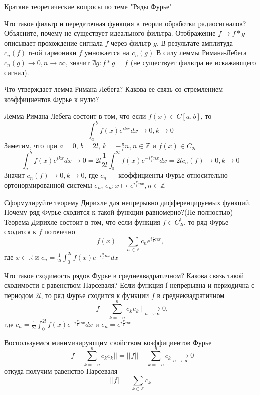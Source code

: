 \documentclass{article}
\begin{document}
\begin{section}{Краткие теоретические вопросы по теме "Ряды Фурье"}
\begin{subsection}{Что такое фильтр и передаточная функция в теории обработки радиосигналов? Объясните, почему не существует идеального фильтра.}
Отображение $f \rightarrow f*g$ описывает прохождение сигнала $f$ через фильтр $g$. 
В результате амплитуда $c_n(f)$ n-ой гармоники $f$ умножается на $c_n(g)$
В силу леммы Римана-Лебега $c_n(g)\rightarrow 0, n\rightarrow \infty$, значит $\nexists g: f*g=f$ (не существует фильтра не искажающего сигнал).
\end{subsection}


\begin{subsection}{Что утверждает лемма Римана-Лебега? Какова ее связь со стремлением коэффициентов Фурье к нулю?}

Лемма Римана-Лебега состоит в том, что если $f(x)\in C[a,b]$, то
\[\int_a^b f(x)e^{ikx}dx \rightarrow 0, k \rightarrow 0\]
Заметим, что при $a = 0$, $b = 2l$, $k=-\frac{\pi}{l}n, n \in \mathbb{Z}$ и $f(x)\in C_{2l}$ 
\[\int_a^b f(x)e^{ikx}dx \rightarrow 0 = 2l \frac{1}{2l}\int_0^{2l}f(x)e^{-i\frac{\pi}{l}nx}dx = 2lc_n(f) \rightarrow 0, k \rightarrow 0\]
Значит $c_n(f) \rightarrow 0, k \rightarrow 0$, 
где $c_n$ --- коэффициенты Фурье относительно ортонормированной системы ${e_n}$, $e_n: x \mapsto e^{i\frac{\pi}{l}nx}, n \in \mathbb{Z}$
\end{subsection}


\begin{subsection}{Сформулируйте теорему Дирихле для непрерывно дифференцируемых функций. Почему ряд Фурье сходится к такой функции равномерно?(Не полностью)}
Теорема Дирихле состоит в том, что если функция $f \in C_{2l}^1$, то ряд Фурье сходится к $f$ поточечно
\[f(x)=\sum_{n \in \mathbb{Z}} c_n e^{i\frac{\pi}{l}nx}, \]
где $x \in \mathbb{R}$ и $c_n = \frac{1}{2l}\int_0^{2l}f(x)e^{-i\frac{\pi}{l}nx}dx$
\end{subsection}


\begin{subsection}{Что такое сходимость рядов Фурье в среднеквадратичном? Какова связь такой сходимости с равенством Парсеваля?}
Если функция f непрерывна и периодична с периодом $ 2l $, то ряд Фурье сходится к функции $ f $ в среднеквадратичном
\[ ||f-\sum_{k=-n}^{n} c_k e_k|| \underset{n \rightarrow \infty}{\longrightarrow} 0 ,\] 
где $c_n = \frac{1}{2l}\int_0^{2l}f(x)e^{-i\frac{\pi}{l}nx}dx$ и $e_n = e^{i\frac{\pi}{l}nx}$

Воспользуемся минимизирующим свойством коэффициентов Фурье 
\[ ||f-\sum_{k=-n}^{n} c_k e_k|| = 
||f|| - \sum_{k=-n}^{n}c_k \underset{n \rightarrow \infty}{\longrightarrow} 0\]
откуда получим равенство Парсеваля
\[ ||f|| = \sum_{k \in \mathbb{Z}} c_k \]
\end{subsection}



\end{section}
\end{document}
